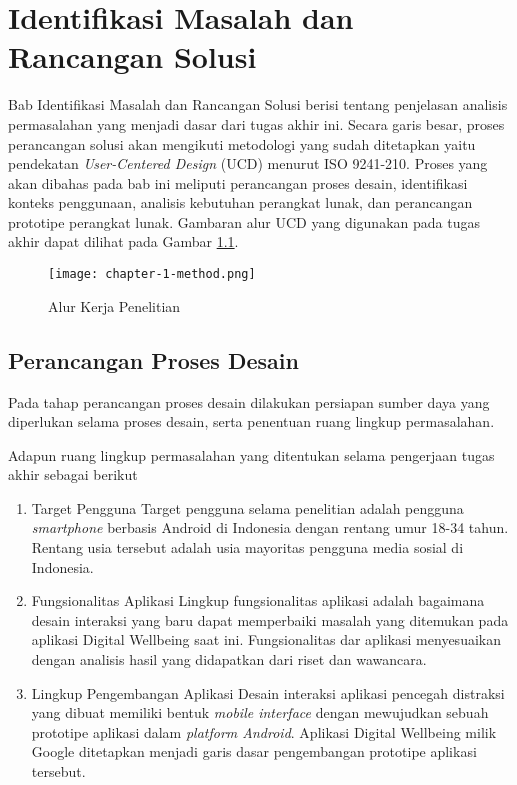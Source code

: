 \chapter{Identifikasi Masalah dan Rancangan Solusi}

Bab Identifikasi Masalah dan Rancangan Solusi berisi tentang penjelasan analisis permasalahan yang menjadi dasar dari tugas akhir ini. Secara garis besar, proses perancangan solusi akan mengikuti metodologi yang sudah ditetapkan yaitu pendekatan \textit{User-Centered Design} (UCD) menurut ISO 9241-210. Proses yang akan dibahas pada bab ini meliputi perancangan proses desain, identifikasi konteks penggunaan, analisis kebutuhan perangkat lunak, dan perancangan prototipe perangkat lunak. Gambaran alur UCD yang digunakan pada tugas akhir dapat dilihat pada Gambar \ref{fig:diagram_alur_kerja}.

\begin{figure}[h]
  \centering
  \texttt{[image: chapter-1-method.png]}
  \caption{Alur Kerja Penelitian}
  \label{fig:diagram_alur_kerja}
\end{figure}

\section{Perancangan Proses Desain}
\label{sec:perancangan_proses_desain}

Pada tahap perancangan proses desain dilakukan persiapan sumber daya yang diperlukan selama proses desain, serta penentuan ruang lingkup permasalahan.

Adapun ruang lingkup permasalahan yang ditentukan selama pengerjaan tugas akhir sebagai berikut

\begin{enumerate}
  \item Target Pengguna
  \subitem Target pengguna selama penelitian adalah pengguna \textit{smartphone} berbasis Android di Indonesia dengan rentang umur 18-34 tahun. Rentang usia tersebut adalah usia mayoritas pengguna media sosial di Indonesia. \parencite{mediasosial2020} 
  
  \item Fungsionalitas Aplikasi
  \subitem Lingkup fungsionalitas aplikasi adalah bagaimana desain interaksi yang baru dapat memperbaiki masalah yang ditemukan pada aplikasi Digital Wellbeing saat ini. Fungsionalitas dar aplikasi menyesuaikan dengan analisis hasil yang didapatkan dari riset dan wawancara. 
   
  \item Lingkup Pengembangan Aplikasi
  \subitem Desain interaksi aplikasi pencegah distraksi yang dibuat memiliki bentuk \textit{mobile interface} dengan mewujudkan sebuah prototipe aplikasi dalam \textit{platform Android}. Aplikasi Digital Wellbeing milik Google ditetapkan menjadi garis dasar pengembangan prototipe aplikasi tersebut.

\end{enumerate}


